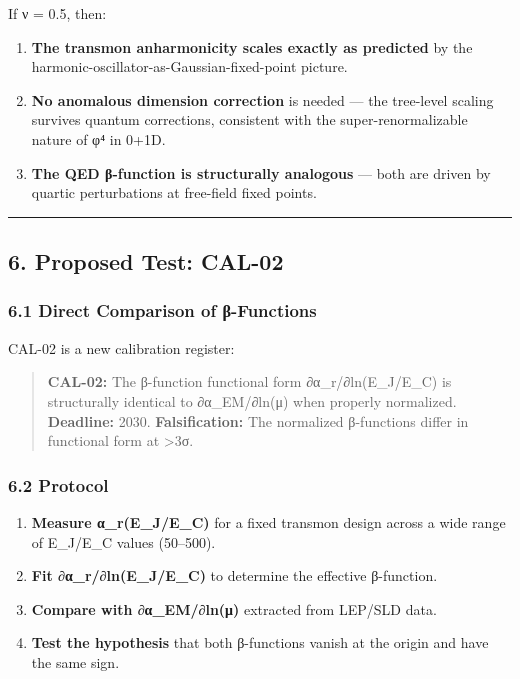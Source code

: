 \documentclass[
]{article}
\providecommand{\tightlist}{%
  \setlength{\itemsep}{0pt}\setlength{\parskip}{0pt}}
\begin{document}
If ν = 0.5, then:

\begin{enumerate}
\def\labelenumi{\arabic{enumi}.}
\tightlist
\item
  \textbf{The transmon anharmonicity scales exactly as predicted} by the
  harmonic-oscillator-as-Gaussian-fixed-point picture.
\item
  \textbf{No anomalous dimension correction} is needed --- the
  tree-level scaling survives quantum corrections, consistent with the
  super-renormalizable nature of φ⁴ in 0+1D.
\item
  \textbf{The QED β-function is structurally analogous} --- both are
  driven by quartic perturbations at free-field fixed points.
\end{enumerate}

\begin{center}\rule{0.5\linewidth}{0.5pt}\end{center}

\subsection{6. Proposed Test: CAL-02}\label{proposed-test-cal-02}

\subsubsection{6.1 Direct Comparison of
β-Functions}\label{direct-comparison-of-ux3b2-functions}

CAL-02 is a new calibration register:

\begin{quote}
\textbf{CAL-02:} The β-function functional form ∂α\_r/∂ln(E\_J/E\_C) is
structurally identical to ∂α\_EM/∂ln(μ) when properly normalized.
\textbf{Deadline:} 2030. \textbf{Falsification:} The normalized
β-functions differ in functional form at \textgreater3σ.
\end{quote}

\subsubsection{6.2 Protocol}\label{protocol}

\begin{enumerate}
\def\labelenumi{\arabic{enumi}.}
\tightlist
\item
  \textbf{Measure α\_r(E\_J/E\_C)} for a fixed transmon design across a
  wide range of E\_J/E\_C values (50--500).
\item
  \textbf{Fit ∂α\_r/∂ln(E\_J/E\_C)} to determine the effective
  β-function.
\item
  \textbf{Compare with ∂α\_EM/∂ln(μ)} extracted from LEP/SLD data.
\item
  \textbf{Test the hypothesis} that both β-functions vanish at the
  origin and have the same sign.
\end{enumerate}
\end{document}
